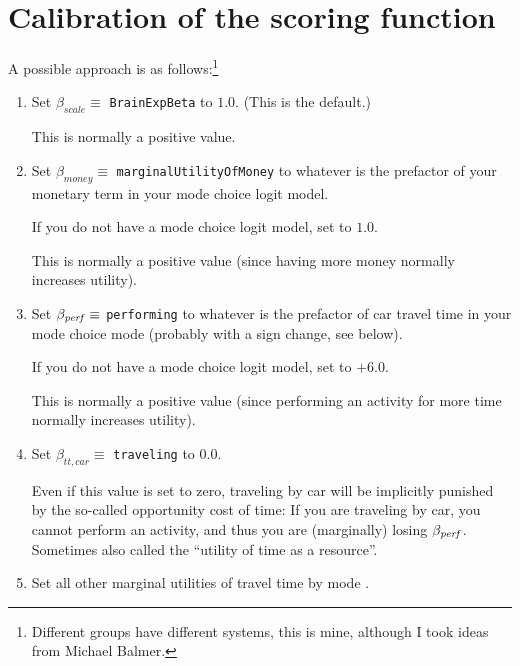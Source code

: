 \section{Calibration of the scoring function}

\label{sec:quickstart-kn}

A possible approach is as follows:\footnote{%
%
Different groups have different systems, this is mine, although I took ideas from Michael Balmer.
%
}
\begin{enumerate}

\item Set $\beta_{scale} \equiv$ \verb$BrainExpBeta$ to $1.0$.  (This is the default.)

This is normally a positive value.

\item Set $\beta_{money} \equiv$ \verb$marginalUtilityOfMoney$ to whatever is the prefactor of your monetary term in your mode choice logit model.

If you do not have a mode choice logit model, set to $1.0$. 

This is normally a positive value (since having more money normally increases utility).

\item Set $\beta_{\it perf} \equiv$ \verb$performing$ to whatever is the prefactor of car travel time in your mode choice mode (probably with a sign change, see below).

If you do not have a mode choice logit model, set to $+6.0$.

This is normally a positive value (since performing an activity for more time normally increases utility).

\item Set $\beta_{tt,car} \equiv$ \verb$traveling$ to $0.0$.

  Even if this value is set to zero, traveling by car will be implicitly punished by the so-called opportunity cost of time: If you are traveling by car, you cannot perform an activity, and thus you are (marginally) losing $\beta_{\it perf}$.  Sometimes also called the ``utility of time as a resource''.

\item Set all other marginal utilities of travel time by mode .


\end{enumerate}
